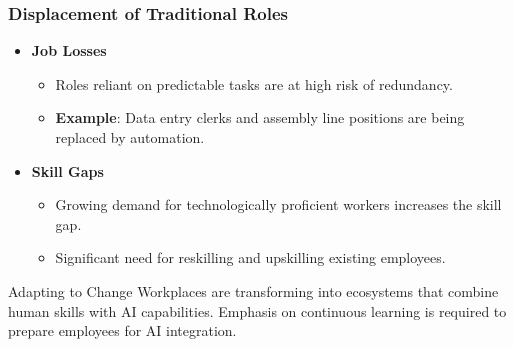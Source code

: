 \documentclass[aspectratio=169]{beamer}
\begin{document}
\begin{frame}[fragile]
    \frametitle{Displacement of Traditional Roles}
    \begin{itemize}
        \item \textbf{Job Losses}
        \begin{itemize}
            \item Roles reliant on predictable tasks are at high risk of redundancy.
            \item \textbf{Example}: Data entry clerks and assembly line positions are being replaced by automation.
        \end{itemize}

        \item \textbf{Skill Gaps}
        \begin{itemize}
            \item Growing demand for technologically proficient workers increases the skill gap.
            \item Significant need for reskilling and upskilling existing employees.
        \end{itemize}
    \end{itemize}
    
    \begin{block}{Adapting to Change}
        Workplaces are transforming into ecosystems that combine human skills with AI capabilities.
        Emphasis on continuous learning is required to prepare employees for AI integration.
    \end{block}
\end{frame}
\end{document}

